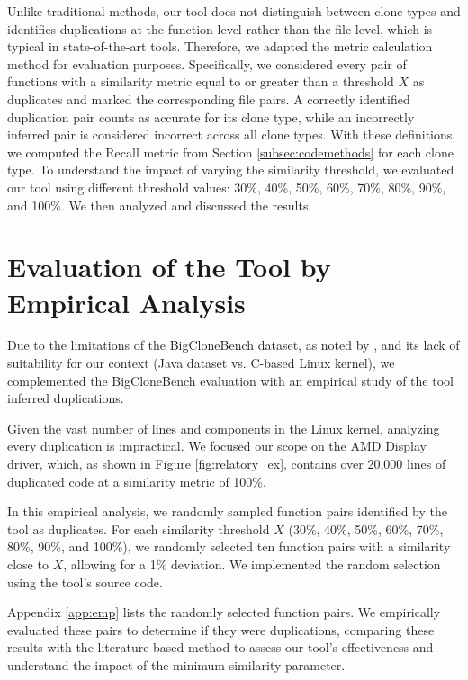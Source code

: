 Unlike traditional methods, our tool does not distinguish between clone types and identifies duplications at the function level rather than the file level, which is typical in state-of-the-art tools. Therefore, we adapted the metric calculation method for evaluation purposes. Specifically, we considered every pair of functions with a similarity metric equal to or greater than a threshold \(X\) as duplicates and marked the corresponding file pairs. A correctly identified duplication pair counts as accurate for its clone type, while an incorrectly inferred pair is considered incorrect across all clone types. With these definitions, we computed the Recall metric from Section \ref{subsec:codemethods} for each clone type.
%
To understand the impact of varying the similarity threshold, we evaluated our tool using different threshold values: 30\%, 40\%, 50\%, 60\%, 70\%, 80\%, 90\%, and 100\%. We then analyzed and discussed the results.

\section{Evaluation of the Tool by Empirical Analysis}

\label{sec:metemp}


Due to the limitations of the BigCloneBench dataset, as noted by \cite{bigfail}, and its lack of suitability 
for our context (Java dataset vs. C-based Linux kernel), we complemented the BigCloneBench evaluation with 
an empirical study of the tool inferred duplications.

%
Given the vast number of lines and components in the Linux kernel, analyzing every duplication is impractical. We focused our scope on the AMD Display driver, which, as shown in Figure \ref{fig:relatory_ex}, contains over 20,000 lines of duplicated code at a similarity metric of 100\%.

In this empirical analysis, we randomly sampled function pairs identified by the tool as duplicates. For each similarity threshold \(X\) (30\%, 40\%, 50\%, 60\%, 70\%, 80\%, 90\%, and 100\%), we randomly selected ten function pairs with a similarity close to \(X\), allowing for a 1\% deviation. We implemented the random selection using the tool's source code.

Appendix \ref{app:emp} lists the randomly selected function pairs. We empirically evaluated these pairs to determine if they were duplications, comparing these results with the literature-based method to assess our tool's effectiveness and understand the impact of the minimum similarity parameter.


